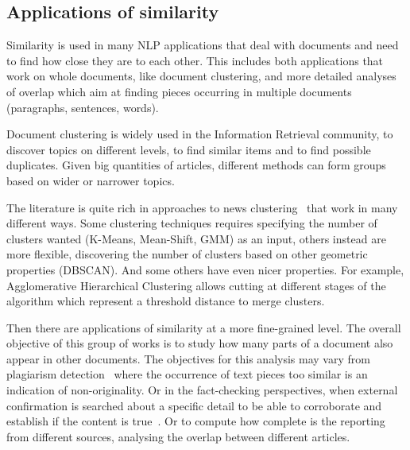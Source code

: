 \subsection{Applications of similarity}

Similarity is used in many NLP applications that deal with documents and need to find how close they are to each other. This includes both applications that work on whole documents, like document clustering, and more detailed analyses of overlap which aim at finding pieces occurring in multiple documents (paragraphs, sentences, words).

Document clustering is widely used in the Information Retrieval community, to discover topics on different levels, to find similar items and to find possible duplicates. Given big quantities of articles, different methods can form groups based on wider or narrower topics.

The literature is quite rich in approaches to news clustering~\cite{carpineto2009survey,andrews2007recent} %
that work in many different ways.
Some clustering techniques requires specifying the number of clusters wanted (K-Means, Mean-Shift, GMM) as an input, others instead are more flexible, discovering the number of clusters based on other geometric properties (DBSCAN).
And some others have even nicer properties.
For example, Agglomerative Hierarchical Clustering allows cutting at different stages of the algorithm which represent a threshold distance to merge clusters.






Then there are applications of similarity at a more fine-grained level.
The overall objective of this group of works is to study how many parts of a document also appear in other documents.
The objectives for this analysis may vary from plagiarism detection~\cite{potthast2010evaluation} where the occurrence of text pieces too similar is an indication of non-originality.
Or in the fact-checking perspectives, when external confirmation is searched about a specific detail to be able to corroborate and establish if the content is true~\cite{karadzhov2017fully}.
Or to compute how complete is the reporting from different sources, analysing the overlap between different articles.

